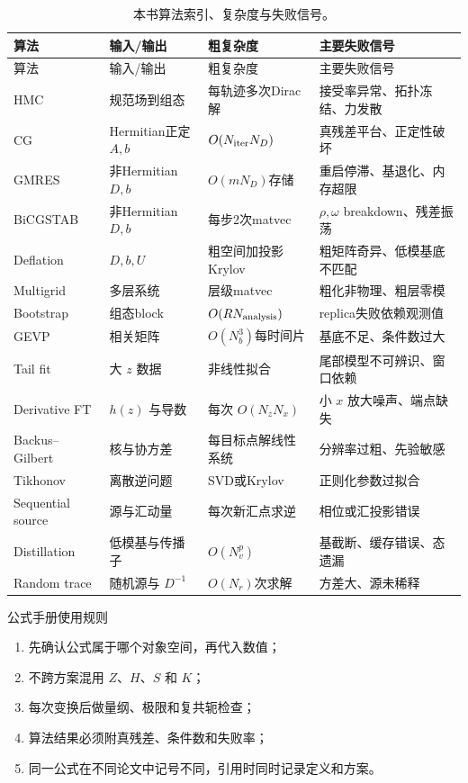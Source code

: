 \documentclass[UTF8,12pt,a4paper,twoside,openany]{ctexbook}
\begin{document}
\begin{longtable}{L{2.2cm}L{2.8cm}L{2.7cm}L{5.2cm}}
\caption{本书算法索引、复杂度与失败信号。}\label{tab:algorithm-index}\\
\toprule
算法 & 输入/输出 & 粗复杂度 & 主要失败信号 \\
\midrule
\endfirsthead
\toprule
算法 & 输入/输出 & 粗复杂度 & 主要失败信号 \\
\midrule
\endhead
\bottomrule
\endfoot
HMC & 规范场到组态 & 每轨迹多次Dirac解 & 接受率异常、拓扑冻结、力发散 \\
CG & Hermitian正定 \(A,b\) & \(O(N_{\rm iter}N_D)\) & 真残差平台、正定性破坏 \\
GMRES & 非Hermitian \(D,b\) & \(O(mN_D)\)存储 & 重启停滞、基退化、内存超限 \\
BiCGSTAB & 非Hermitian \(D,b\) & 每步2次matvec & \(\rho,\omega\) breakdown、残差振荡 \\
Deflation & \(D,b,U\) & 粗空间加投影Krylov & 粗矩阵奇异、低模基底不匹配 \\
Multigrid & 多层系统 & 层级matvec & 粗化非物理、粗层零模 \\
Bootstrap & 组态block & \(O(RN_{\rm analysis})\) & replica失败依赖观测值 \\
GEVP & 相关矩阵 & \(O(N_b^3)\)每时间片 & 基底不足、条件数过大 \\
Tail fit & 大 \(z\) 数据 & 非线性拟合 & 尾部模型不可辨识、窗口依赖 \\
Derivative FT & \(h(z)\) 与导数 & 每次 \(O(N_zN_x)\) & 小 \(x\) 放大噪声、端点缺失 \\
Backus--Gilbert & 核与协方差 & 每目标点解线性系统 & 分辨率过粗、先验敏感 \\
Tikhonov & 离散逆问题 & SVD或Krylov & 正则化参数过拟合 \\
Sequential source & 源与汇动量 & 每次新汇点求逆 & 相位或汇投影错误 \\
Distillation & 低模基与传播子 & \(O(N_v^p)\) & 基截断、缓存错误、态遗漏 \\
Random trace & 随机源与 \(D^{-1}\) & \(O(N_r)\)次求解 & 方差大、源未稀释 \\
\end{longtable}

\begin{checkpointbox}{公式手册使用规则}
\begin{enumerate}
  \item 先确认公式属于哪个对象空间，再代入数值；
  \item 不跨方案混用 \(Z\)、\(H\)、\(S\) 和 \(K\)；
  \item 每次变换后做量纲、极限和复共轭检查；
  \item 算法结果必须附真残差、条件数和失败率；
  \item 同一公式在不同论文中记号不同，引用时同时记录定义和方案。
\end{enumerate}
\end{checkpointbox}
\end{document}
